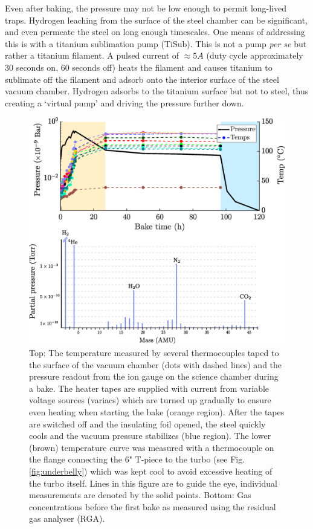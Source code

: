 		Even after baking, the pressure may not be low enough to permit long-lived traps.
		Hydrogen leaching from the surface of the steel chamber can be significant, and even permeate the steel on long enough timescales.
		One means of addressing this is with a titanium sublimation pump (TiSub).
		This is not a pump \emph{per se} but rather a titanium filament.
		A pulsed current of $\approx5A$ (duty cycle approximately 30 seconds on, 60 seconds off) heats the filament and causes titanium to sublimate off the filament and adsorb onto the interior surface of the steel vacuum chamber.
		Hydrogen adsorbs to the titanium surface but not to steel, thus creating a `virtual pump' and driving the pressure further down.


		\begin{figure}
		\includegraphics[width=\textwidth]{fig/lattice/RGA_pre_post_bake_nice}
		\caption{Top: The temperature measured by several thermocouples taped to the surface of the vacuum chamber (dots with dashed lines) and the pressure readout from the ion gauge on the science chamber during a bake.
		The heater tapes are supplied with current from variable voltage sources (variacs) which are turned up gradually to ensure even heating when starting the bake (orange region).
		After the tapes are switched off and the insulating foil opened, the steel quickly cools and the vacuum pressure stabilizes (blue region).
		The lower (brown) temperature curve was measured with a thermocouple on the flange connecting the 6" T-piece to the turbo (see Fig. \ref{fig:underbelly}) which was kept cool to avoid excessive heating of the turbo itself. 
		Lines in this figure are to guide the eye, individual measurements are denoted by the solid points.
		Bottom:
		Gas concentrations before the first bake as measured using the residual gas analyser (RGA).}
		\label{fig:bakeouts}
		\end{figure}

